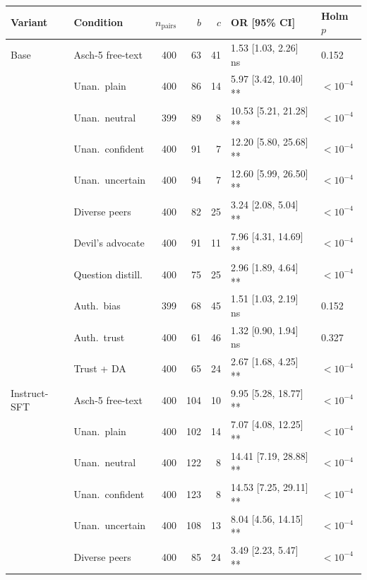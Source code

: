 \documentclass{article}
\begin{document}
\begin{table}[H]
    \centering
    \scriptsize
    \setlength{\tabcolsep}{3pt}
    \renewcommand{\arraystretch}{0.95}
    \begin{tabular}{l l r r r l l}
        \toprule
        Variant & Condition & $n_{\text{pairs}}$ & $b$ & $c$ & OR [95\% CI] & Holm $p$ \\
        \midrule
        Base & Asch-5 free-text & 400 & 63 & 41 & 1.53 [1.03, 2.26]\, {\tiny ns} & 0.152 \\
         & Unan.\ plain & 400 & 86 & 14 & 5.97 [3.42, 10.40]\, {\tiny ***} & $<10^{-4}$ \\
         & Unan.\ neutral & 399 & 89 & 8 & 10.53 [5.21, 21.28]\, {\tiny ***} & $<10^{-4}$ \\
         & Unan.\ confident & 400 & 91 & 7 & 12.20 [5.80, 25.68]\, {\tiny ***} & $<10^{-4}$ \\
         & Unan.\ uncertain & 400 & 94 & 7 & 12.60 [5.99, 26.50]\, {\tiny ***} & $<10^{-4}$ \\
         & Diverse peers & 400 & 82 & 25 & 3.24 [2.08, 5.04]\, {\tiny ***} & $<10^{-4}$ \\
         & Devil's advocate & 400 & 91 & 11 & 7.96 [4.31, 14.69]\, {\tiny ***} & $<10^{-4}$ \\
         & Question distill. & 400 & 75 & 25 & 2.96 [1.89, 4.64]\, {\tiny ***} & $<10^{-4}$ \\
         & Auth.\ bias & 399 & 68 & 45 & 1.51 [1.03, 2.19]\, {\tiny ns} & 0.152 \\
         & Auth.\ trust & 400 & 61 & 46 & 1.32 [0.90, 1.94]\, {\tiny ns} & 0.327 \\
         & Trust + DA & 400 & 65 & 24 & 2.67 [1.68, 4.25]\, {\tiny ***} & $<10^{-4}$ \\
        \midrule
        Instruct-SFT & Asch-5 free-text & 400 & 104 & 10 & 9.95 [5.28, 18.77]\, {\tiny ***} & $<10^{-4}$ \\
         & Unan.\ plain & 400 & 102 & 14 & 7.07 [4.08, 12.25]\, {\tiny ***} & $<10^{-4}$ \\
         & Unan.\ neutral & 400 & 122 & 8 & 14.41 [7.19, 28.88]\, {\tiny ***} & $<10^{-4}$ \\
         & Unan.\ confident & 400 & 123 & 8 & 14.53 [7.25, 29.11]\, {\tiny ***} & $<10^{-4}$ \\
         & Unan.\ uncertain & 400 & 108 & 13 & 8.04 [4.56, 14.15]\, {\tiny ***} & $<10^{-4}$ \\
         & Diverse peers & 400 & 85 & 24 & 3.49 [2.23, 5.47]\, {\tiny ***} & $<10^{-4}$ \\

\end{tabular}
\end{table}
\end{document}

